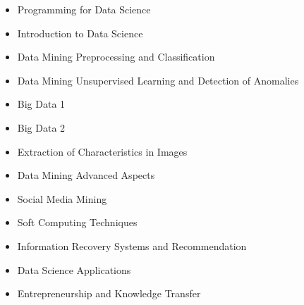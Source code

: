 

\begin{itemize}
\item Programming for Data Science
\item Introduction to Data Science
\item Data Mining Preprocessing and Classification
\item Data Mining Unsupervised Learning and Detection of Anomalies
\item Big Data 1
\item Big Data 2
\item Extraction of Characteristics in Images
\item Data Mining Advanced Aspects
\item Social Media Mining
\item Soft Computing Techniques
\item Information Recovery Systems and Recommendation
\item Data Science Applications
\item Entrepreneurship and Knowledge Transfer
\end{itemize}


\divider














\divider




\clearpage
